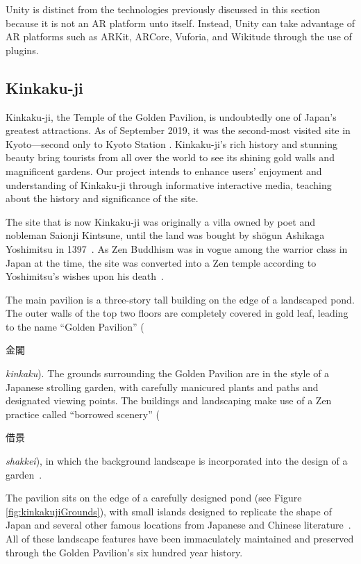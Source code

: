\documentclass[a4paper, 10pt, american, titlepage]{article}
\begin{document}
Unity is distinct from the technologies previously discussed in this section
because it is not an AR platform unto itself. Instead, Unity can take advantage
of AR platforms such as ARKit, ARCore, Vuforia, and Wikitude through the use of
plugins.

\subsection{Kinkaku-ji}
\label{sec:kinkaku-ji}

Kinkaku-ji, the Temple of the Golden Pavilion, is undoubtedly one of Japan's
greatest attractions.  As of September 2019, it was the second-most visited site
in Kyoto---second only to Kyoto Station \autocite{japanguide2019}. Kinkaku-ji's
rich history and stunning beauty bring tourists from all over the world to see
its shining gold walls and magnificent gardens. Our project intends to enhance
users' enjoyment and understanding of Kinkaku-ji through informative interactive
media, teaching about the history and significance of the site.

The site that is now Kinkaku-ji was originally a villa owned by poet and
nobleman Saionji Kintsune, until the land was bought by shōgun Ashikaga
Yoshimitsu in 1397~\autocite{noboru2013}. As Zen Buddhism was in vogue among the
warrior class in Japan at the time, the site was converted into a Zen temple
according to Yoshimitsu's wishes upon his death~\autocite{bornoff2000}.

The main pavilion is a three-story tall building on the edge of a landscaped
pond. The outer walls of the top two floors are completely covered in gold leaf,
leading to the name ``Golden Pavilion'' (\begin{CJK}{UTF8}{min}金閣\end{CJK}
\textit{kinkaku}). The grounds surrounding the Golden Pavilion are in the style
of a Japanese strolling garden, with carefully manicured plants and paths and
designated viewing points. The buildings and landscaping make use of a Zen
practice called ``borrowed scenery'' (\begin{CJK}{UTF8}{min}借景\end{CJK}
\textit{shakkei}), in which the background landscape is incorporated into the
design of a garden~\autocite{noboru2013}.

The pavilion sits on the edge of a carefully designed pond (see Figure
\ref{fig:kinkakujiGrounds}), with small islands designed to replicate the shape
of Japan and several other famous locations from Japanese and Chinese
literature~\autocite{young2007}. All of these landscape features have been
immaculately maintained and preserved through the Golden Pavilion's six hundred
year history.
\end{document}
